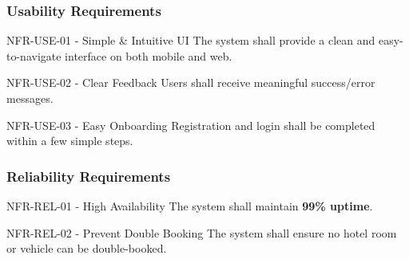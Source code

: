 \documentclass[12pt,a4paper]{article}
\newlength{\ThesisParagraphIndent}
\begin{document}
\subsubsection{Usability Requirements}

\begin{list}{}{\setlength{\leftmargin}{\dimexpr\ThesisParagraphIndent+1.5em\relax}\setlength{\labelsep}{0.5em}\setlength{\topsep}{2pt}\setlength{\parsep}{0pt}}
\item[\textbullet] NFR-USE-01 - Simple \& Intuitive UI\newline{} The system shall provide a clean and easy-to-navigate interface on both mobile and web.
\end{list}


\begin{list}{}{\setlength{\leftmargin}{\dimexpr\ThesisParagraphIndent+1.5em\relax}\setlength{\labelsep}{0.5em}\setlength{\topsep}{2pt}\setlength{\parsep}{0pt}}
\item[\textbullet] NFR-USE-02 - Clear Feedback\textbf{\newline{} }Users shall receive meaningful success/error messages.
\end{list}


\begin{list}{}{\setlength{\leftmargin}{\dimexpr\ThesisParagraphIndent+1.5em\relax}\setlength{\labelsep}{0.5em}\setlength{\topsep}{2pt}\setlength{\parsep}{0pt}}
\item[\textbullet] NFR-USE-03 - Easy Onboarding\newline{} Registration and login shall be completed within a few simple steps.
\end{list}


\subsubsection{Reliability Requirements}

\begin{list}{}{\setlength{\leftmargin}{\dimexpr\ThesisParagraphIndent+1.5em\relax}\setlength{\labelsep}{0.5em}\setlength{\topsep}{2pt}\setlength{\parsep}{0pt}}
\item[\textbullet] NFR-REL-01 - High Availability\newline{} The system shall maintain \textbf{99\% uptime}.
\end{list}


\begin{list}{}{\setlength{\leftmargin}{\dimexpr\ThesisParagraphIndent+1.5em\relax}\setlength{\labelsep}{0.5em}\setlength{\topsep}{2pt}\setlength{\parsep}{0pt}}
\item[\textbullet] NFR-REL-02 - Prevent Double Booking\textbf{\newline{} }The system shall ensure no hotel room or vehicle can be double-booked.
\end{list}
\end{document}
